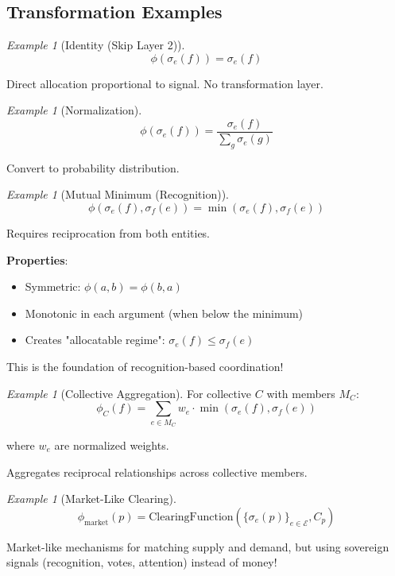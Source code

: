 \documentclass[11pt,a4paper]{article}
\theoremstyle{definition}
\theoremstyle{remark}
\newtheorem{example}[theorem]{Example}
\newcommand{\E}{\mathcal{E}}
\begin{document}
\subsection{Transformation Examples}

\begin{example}[Identity (Skip Layer 2)]
\[ \phi(\sigma_e(f)) = \sigma_e(f) \]

Direct allocation proportional to signal. No transformation layer.
\end{example}

\begin{example}[Normalization]
\[ \phi(\sigma_e(f)) = \frac{\sigma_e(f)}{\sum_g \sigma_e(g)} \]

Convert to probability distribution.
\end{example}

\begin{example}[Mutual Minimum (Recognition)]
\[ \phi(\sigma_e(f), \sigma_f(e)) = \min(\sigma_e(f), \sigma_f(e)) \]

Requires reciprocation from both entities.

\textbf{Properties}:
\begin{itemize}
\item Symmetric: $\phi(a,b) = \phi(b,a)$
\item Monotonic in each argument (when below the minimum)
\item Creates "allocatable regime": $\sigma_e(f) \le \sigma_f(e)$
\end{itemize}

This is the foundation of recognition-based coordination!
\end{example}

\begin{example}[Collective Aggregation]
For collective $C$ with members $M_C$:
\[ \phi_C(f) = \sum_{e \in M_C} w_e \cdot \min(\sigma_e(f), \sigma_f(e)) \]

where $w_e$ are normalized weights.

Aggregates reciprocal relationships across collective members.
\end{example}

\begin{example}[Market-Like Clearing]
\[ \phi_{\text{market}}(p) = \text{ClearingFunction}(\{\sigma_e(p)\}_{e \in \E}, C_p) \]

Market-like mechanisms for matching supply and demand, but using sovereign signals (recognition, votes, attention) instead of money!
\end{example}
\end{document}
